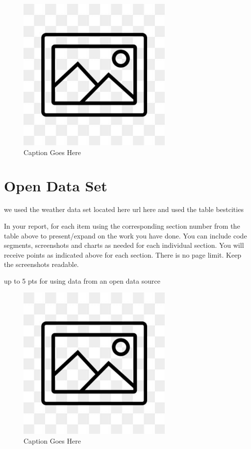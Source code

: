 \documentclass[12pt, letterpaper]{article}
\begin{document}
\begin{figure}[htbp]
	\centering
	\includegraphics[width=3in]{images/placeholder.jpg}
	\caption{Caption Goes Here}
 \end{figure}

 \newpage

\section{Open Data Set}
we used the weather data set located here url here and used the table bestcities

In your report, for each item using the corresponding section number from the table above to present/expand on the work you have done. You can include code segments, screenshots and charts as needed for each individual section. You will receive points as indicated above for each section. There is no page limit. Keep the screenshots readable.

up to 5 pts for using data from an open data source

\begin{figure}[htbp]
	\centering
	\includegraphics[width=3in]{images/placeholder.jpg}
	\caption{Caption Goes Here}
 \end{figure}
\end{document}
